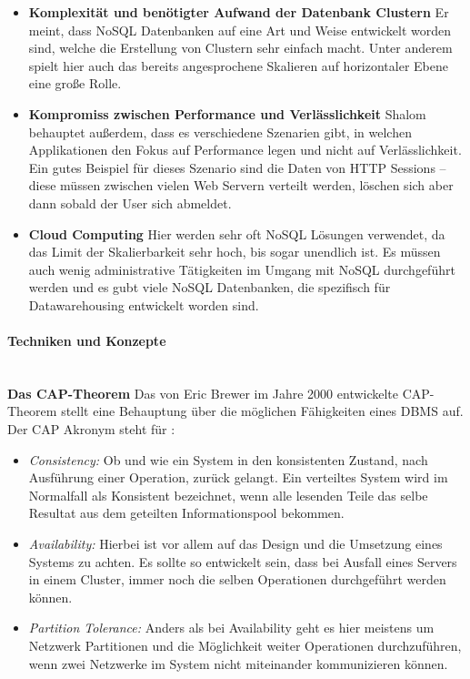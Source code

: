\begin{itemize}
	\item \textbf{Komplexität und benötigter Aufwand der Datenbank Clustern}\newline
	 Er meint, dass NoSQL Datenbanken auf eine Art und Weise entwickelt worden sind, welche die Erstellung von Clustern sehr einfach macht. Unter anderem spielt hier auch das bereits angesprochene Skalieren auf horizontaler Ebene eine große Rolle.
	
	\item \textbf{Kompromiss zwischen Performance und Verlässlichkeit}\newline
	 Shalom behauptet außerdem, dass es verschiedene Szenarien gibt, in welchen Applikationen den Fokus auf Performance legen und nicht auf Verlässlichkeit. Ein gutes Beispiel für dieses Szenario sind die Daten von HTTP Sessions – diese müssen zwischen vielen Web Servern verteilt werden, löschen sich aber dann sobald der User sich abmeldet.

	\item \textbf{Cloud Computing}\newline
	 Hier werden sehr oft NoSQL Lösungen verwendet, da das Limit der Skalierbarkeit sehr hoch, bis sogar unendlich ist. Es müssen auch wenig administrative Tätigkeiten im Umgang mit NoSQL durchgeführt werden und es gubt viele NoSQL Datenbanken, die spezifisch für Datawarehousing entwickelt worden sind.
\end{itemize}

\paragraph{Techniken und Konzepte}\mbox{}\\
\textbf{Das CAP-Theorem\newline}
\label{subsec:captheor}
Das von Eric Brewer im Jahre 2000 entwickelte CAP-Theorem stellt eine Behauptung über die möglichen Fähigkeiten eines DBMS auf. Der CAP Akronym steht für \cite{MELD.CH2-noSQL.capTheorem}:

\begin{itemize}
	\item \textit{Consistency:} Ob und wie ein System in den konsistenten Zustand, nach Ausführung einer Operation, zurück gelangt. Ein verteiltes System wird im Normalfall als Konsistent bezeichnet, wenn alle lesenden Teile das selbe Resultat aus dem geteilten Informationspool bekommen.

	\item \textit{Availability:} Hierbei ist vor allem auf das Design und die Umsetzung eines Systems zu achten. Es sollte so entwickelt sein, dass bei Ausfall eines Servers in einem Cluster, immer noch die selben Operationen durchgeführt werden können.

	\item \textit{Partition Tolerance:} Anders als bei Availability geht es hier meistens um Netzwerk Partitionen und die Möglichkeit weiter Operationen durchzuführen, wenn zwei Netzwerke im System nicht miteinander kommunizieren können.
\end{itemize}


